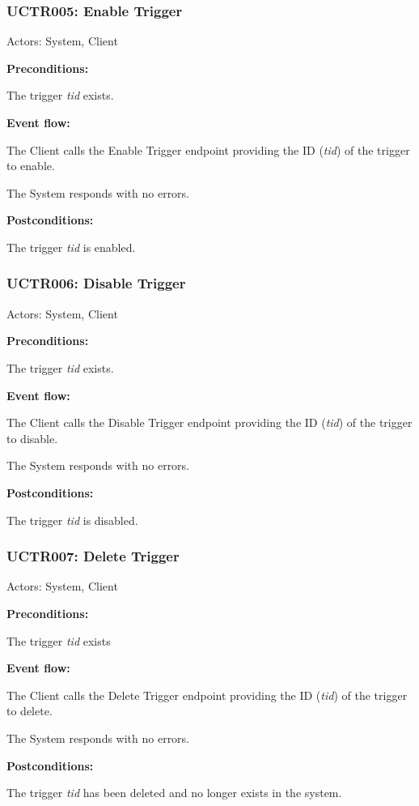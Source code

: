 \begin{ucbox}{\subsubsection{UCTR005: Enable Trigger}}
\label{UCTR005}

Actors: System, Client

\textbf{Preconditions:}

\ucitem The trigger \textit{tid} exists.

\textbf{Event flow:}

\ucitem The Client calls the Enable Trigger endpoint providing the ID (\textit{tid}) of the trigger to enable.

\ucitem The System responds with no errors.

\textbf{Postconditions:}

\ucitem The trigger \textit{tid} is enabled.

\end{ucbox}

\begin{ucbox}{\subsubsection{UCTR006: Disable Trigger}}
\label{UCTR006}

Actors: System, Client

\textbf{Preconditions:}

\ucitem The trigger \textit{tid} exists.

\textbf{Event flow:}

\ucitem The Client calls the Disable Trigger endpoint providing the ID (\textit{tid}) of the trigger to disable.

\ucitem The System responds with no errors.

\textbf{Postconditions:}

\ucitem The trigger \textit{tid} is disabled.

\end{ucbox}

\begin{ucbox}{\subsubsection{UCTR007: Delete Trigger}}
\label{UCTR007}

Actors: System, Client

\textbf{Preconditions:}

\ucitem The trigger \textit{tid} exists

\textbf{Event flow:}

\ucitem The Client calls the Delete Trigger endpoint providing the ID (\textit{tid}) of the trigger to delete.

\ucitem The System responds with no errors.

\textbf{Postconditions:}

\ucitem The trigger \textit{tid} has been deleted and no longer exists in the system.

\end{ucbox}
\newpage